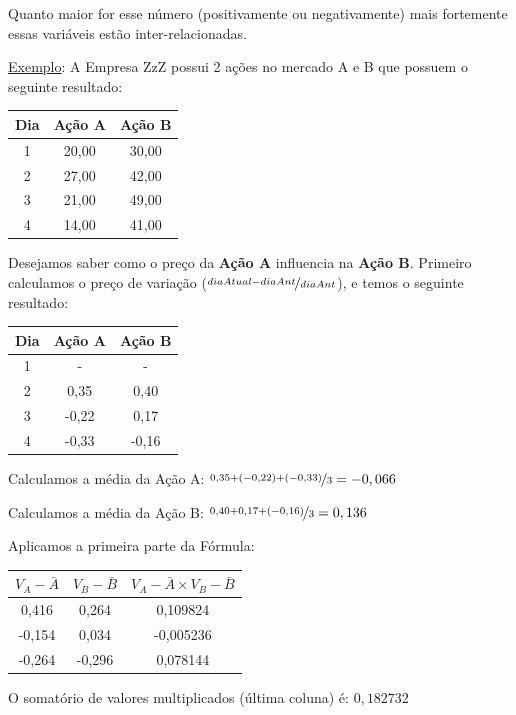 \documentclass[a4paper,11pt]{article}
\begin{document}
Quanto maior for esse número (positivamente ou negativamente) mais fortemente essas variáveis estão inter-relacionadas.

\underline{Exemplo}: A Empresa ZzZ possui 2 ações no mercado A e B que possuem o seguinte resultado: 
\begin{table}[H]
	\centering 
	\begin{tabular}{c|c|c}
		\textbf{Dia} & \textbf{Ação A} & \textbf{Ação B} \\ \hline
		1 & 20,00 & 30,00 \\ \hline
		2 & 27,00 & 42,00 \\ \hline
		3 & 21,00 & 49,00 \\ \hline
		4 & 14,00 & 41,00
	\end{tabular}
\end{table}

Desejamos saber como o preço da \textbf{Ação A} influencia na \textbf{Ação B}. Primeiro calculamos o preço de variação ($\nicefrac{diaAtual - diaAnt}{diaAnt}$), e temos o seguinte resultado:
\begin{table}[H]
	\centering 
	\begin{tabular}{c|c|c}
		\textbf{Dia} & \textbf{Ação A} & \textbf{Ação B} \\ \hline
		1 & - & - \\ \hline
		2 & 0,35 & 0,40 \\ \hline
		3 & -0,22 & 0,17 \\ \hline
		4 & -0,33 & -0,16
	\end{tabular}
\end{table}

Calculamos a média da Ação A: $\nicefrac{0,35 + (-0,22) + (-0,33)}{3} = -0,066$

Calculamos a média da Ação B: $\nicefrac{0,40 + 0,17 + (-0,16)}{3} = 0,136$

Aplicamos a primeira parte da Fórmula:
\begin{table}[H]
	\centering 
	\begin{tabular}{c|c|c}
		\textbf{$V_A - \bar{A}$} & \textbf{$V_B - \bar{B}$} & \textbf{$V_A - \bar{A} \times V_B - \bar{B}$} \\ \hline
		0,416 & 0,264 & 0,109824 \\ \hline
		-0,154 & 0,034 & -0,005236 \\ \hline
		-0,264 & -0,296 & 0,078144
	\end{tabular}
\end{table}

O somatório de valores multiplicados (última coluna) é: $0,182732$
\end{document}
